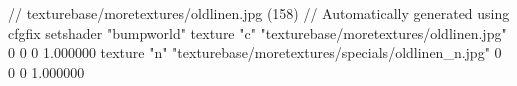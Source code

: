 // texturebase/moretextures/oldlinen.jpg (158)
// Automatically generated using cfgfix
setshader "bumpworld"
texture "c" "texturebase/moretextures/oldlinen.jpg" 0 0 0 1.000000
texture "n" "texturebase/moretextures/specials/oldlinen_n.jpg" 0 0 0 1.000000
